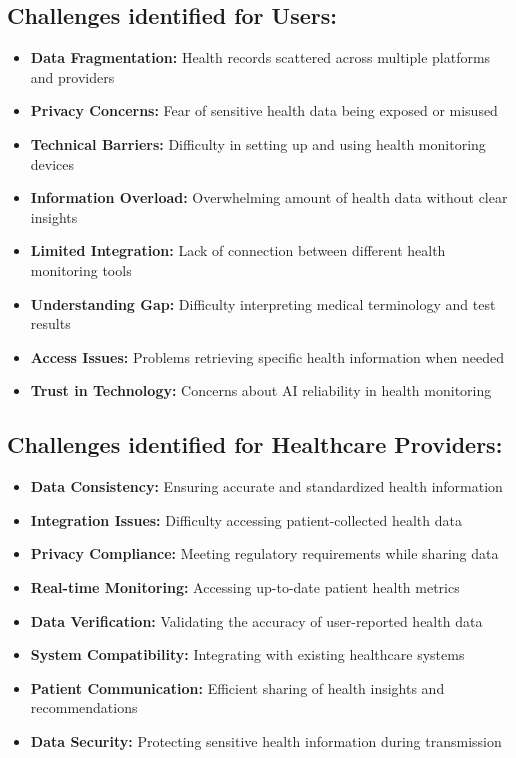\subsection{Challenges identified for Users:}
\begin{itemize}
    \item \textbf{Data Fragmentation:} Health records scattered across multiple platforms and providers
    \item \textbf{Privacy Concerns:} Fear of sensitive health data being exposed or misused
    \item \textbf{Technical Barriers:} Difficulty in setting up and using health monitoring devices
    \item \textbf{Information Overload:} Overwhelming amount of health data without clear insights
    \item \textbf{Limited Integration:} Lack of connection between different health monitoring tools
    \item \textbf{Understanding Gap:} Difficulty interpreting medical terminology and test results
    \item \textbf{Access Issues:} Problems retrieving specific health information when needed
    \item \textbf{Trust in Technology:} Concerns about AI reliability in health monitoring
\end{itemize}

\subsection{Challenges identified for Healthcare Providers:}
\begin{itemize}
    \item \textbf{Data Consistency:} Ensuring accurate and standardized health information
    \item \textbf{Integration Issues:} Difficulty accessing patient-collected health data
    \item \textbf{Privacy Compliance:} Meeting regulatory requirements while sharing data
    \item \textbf{Real-time Monitoring:} Accessing up-to-date patient health metrics
    \item \textbf{Data Verification:} Validating the accuracy of user-reported health data
    \item \textbf{System Compatibility:} Integrating with existing healthcare systems
    \item \textbf{Patient Communication:} Efficient sharing of health insights and recommendations
    \item \textbf{Data Security:} Protecting sensitive health information during transmission
\end{itemize}

